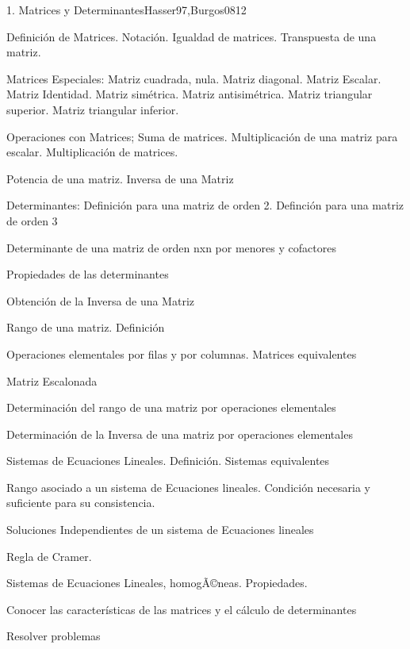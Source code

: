 \begin{syllabus}
\begin{unit}{1. Matrices y Determinantes}{Hasser97,Burgos08}{12}
\begin{topics}
      \item Definición de Matrices. Notación. Igualdad de matrices. Transpuesta de una matriz.
      \item Matrices Especiales: Matriz cuadrada, nula. Matriz diagonal. Matriz  Escalar. Matriz Identidad. Matriz simétrica. Matriz antisimétrica. Matriz  triangular superior. Matriz triangular inferior.
      \item Operaciones con Matrices; Suma de matrices. Multiplicación de una matriz para escalar. Multiplicación de matrices.
	\item Potencia de una matriz. Inversa de una Matriz
	\item Determinantes: Definición para una matriz de orden 2. Definción para una matriz de orden 3
	\item Determinante de una matriz de orden nxn por menores y cofactores
	\item Propiedades de las determinantes
	\item Obtención de la Inversa de una Matriz
	\item Rango de una matriz. Definición
	\item Operaciones elementales por filas y por columnas. Matrices equivalentes
	\item Matriz Escalonada
	\item Determinación del rango de una matriz por operaciones elementales
	\item Determinación de la Inversa de una matriz por operaciones elementales
	\item Sistemas de Ecuaciones Lineales. Definición. Sistemas equivalentes
	\item Rango asociado a un sistema de Ecuaciones lineales. Condición necesaria y suficiente para su consistencia.
	\item Soluciones Independientes de un sistema de Ecuaciones lineales
	\item Regla de Cramer.
	\item Sistemas de Ecuaciones Lineales, homogÃ©neas. Propiedades.
   \end{topics}

   \begin{unitgoals}
      \item Conocer las características de las matrices y el cálculo de determinantes
	\item Resolver problemas
   \end{unitgoals}
\end{unit}


\end{syllabus}
